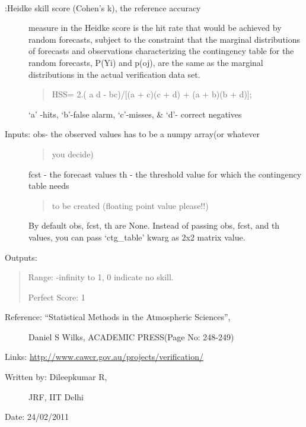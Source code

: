 \documentclass[letterpaper,10pt,english]{sphinxmanual}
\begin{document}

\begin{fulllineitems}
\label{diagnosis:ctgfunction.hss}~\begin{description}
\item[{{\hyperref[diagnosis:ctgfunction.hss]{}}:Heidke skill score (Cohen's k), the reference accuracy}] \leavevmode
measure in the Heidke score is the hit rate that would be
achieved by random forecasts, subject to the constraint that
the marginal distributions of forecasts and observations
characterizing the contingency table for the random forecasts,
P(Yi) and p(oj), are the same as the marginal distributions in
the actual verification data set.
\begin{quote}

HSS= 2.( a d - bc)/{[}(a + c)(c + d) + (a + b)(b + d){]};
\end{quote}

`a' -hits, `b'-false alarm, `c'-misses, \& `d'- correct  negatives

\item[{Inputs: obs- the observed values has to be a numpy array(or whatever}] \leavevmode\begin{quote}

you decide)
\end{quote}

fcst - the forecast values
th  - the threshold value for which the contingency table needs
\begin{quote}

to be created (floating point value please!!)
\end{quote}

By default obs, fcst, th are None. Instead of passing obs, fcst,
and th values, you can pass `ctg\_table' kwarg as 2x2 matrix value.

\end{description}

Outputs:
\begin{quote}

Range: -infinity to 1, 0 indicate no skill.

Perfect Score: 1
\end{quote}
\begin{description}
\item[{Reference: ``Statistical Methods in the Atmospheric Sciences'',}] \leavevmode
Daniel S Wilks, ACADEMIC PRESS(Page No: 248-249)

\end{description}

Links: \href{http://www.cawcr.gov.au/projects/verification/}{http://www.cawcr.gov.au/projects/verification/}
\begin{description}
\item[{Written by: Dileepkumar R,}] \leavevmode
JRF, IIT Delhi

\end{description}

Date: 24/02/2011

\end{fulllineitems}
\end{document}
